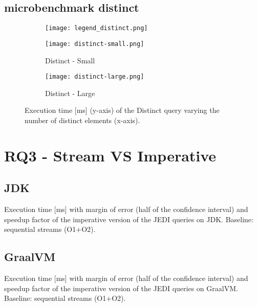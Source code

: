 \documentclass{article}
\begin{document}
\subsection{microbenchmark distinct}
\begin{figure*}[h!]
    \centering

    \begin{subfigure}[b]{.6\textwidth}
        \centering
        \texttt{[image: legend\_distinct.png]}
    \end{subfigure}


    \begin{subfigure}[b]{0.98\textwidth}
        \centering
        \texttt{[image: distinct-small.png]}
        \caption{Distinct - Small}
    \end{subfigure}

    \begin{subfigure}[b]{0.98\textwidth}
        \centering
        \texttt{[image: distinct-large.png]}
        \caption{Distinct - Large}
    \end{subfigure}
    \caption{Execution time [ms] (y-axis) of the Distinct query varying the number of distinct elements (x-axis).}
\end{figure*}


\newpage
\section{RQ3 - Stream VS Imperative}
\subsection{JDK}
\begin{table}[h!]
    \centering
    
     \caption{Execution time [ms] with margin of error (half of the confidence interval) and speedup factor of the
              imperative version of the JEDI queries on JDK. Baseline: sequential streams (O1+O2).}
\end{table}

\subsection{GraalVM}
\begin{table}[h!]
    \centering
    
     \caption{Execution time [ms] with margin of error (half of the confidence interval) and speedup factor of the
              imperative version of the JEDI queries on GraalVM. Baseline: sequential streams (O1+O2).}
\end{table}
\end{document}
